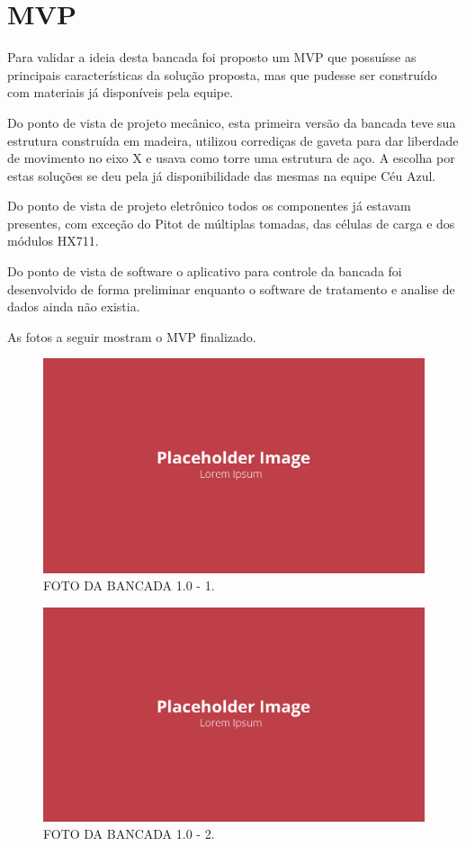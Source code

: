 \section{MVP}

Para validar a ideia desta bancada foi proposto um MVP que possuísse as principais características da solução proposta, mas que pudesse ser construído com materiais já disponíveis pela equipe.

Do ponto de vista de projeto mecânico, esta primeira versão da bancada teve sua estrutura construída em madeira, utilizou corrediças de gaveta para dar liberdade de movimento no eixo X e usava como torre uma estrutura de aço. A escolha por estas soluções se deu pela já disponibilidade das mesmas na equipe Céu Azul.

Do ponto de vista de projeto eletrônico todos os componentes já estavam presentes, com exceção do Pitot de múltiplas tomadas, das células de carga e dos módulos HX711.

Do ponto de vista de software o aplicativo para controle da bancada foi desenvolvido de forma preliminar enquanto o software de tratamento e analise de dados ainda não existia.

As fotos a seguir mostram o MVP finalizado.

\begin{figure}[!ht]
    \centering
    \includegraphics[width=.8\linewidth]{figuras/outras/placeholder.png}
    \caption{FOTO DA BANCADA 1.0 - 1\cite{autor}.}
    \label{fig:placeholder}
\end{figure}

\begin{figure}[!ht]
    \centering
    \includegraphics[width=.8\linewidth]{figuras/outras/placeholder.png}
    \caption{FOTO DA BANCADA 1.0 - 2\cite{autor}.}
    \label{fig:placeholder}
\end{figure}

